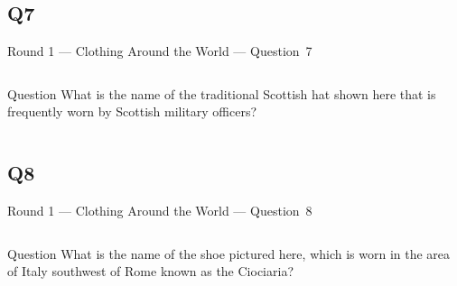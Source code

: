 \documentclass[11pt]{beamer}
\begin{document}
\subsection*{Q7}
\begin{frame}[t]{Round 1 --- Clothing Around the World --- \mbox{Question 7}}
\vspace{-0.5em}
\begin{columns}[T,totalwidth=\linewidth]
\begin{column}{0.37\linewidth}
\begin{block}{Question}
What is the name of the traditional Scottish hat shown here that is frequently worn by Scottish military officers?
\end{block}
\end{column}
\begin{column}{0.62\linewidth}
\begin{center}
\texttt{[image: \{Images/tamoshanter]}.jpeg}
\end{center}
\end{column}
\end{columns}
\end{frame}
\subsection*{Q8}
\begin{frame}[t]{Round 1 --- Clothing Around the World --- \mbox{Question 8}}
\vspace{-0.5em}
\begin{columns}[T,totalwidth=\linewidth]
\begin{column}{0.37\linewidth}
\begin{block}{Question}
What is the name of the shoe pictured here, which is worn in the area of Italy southwest of Rome known as the Ciociaria?
\end{block}
\end{column}
\begin{column}{0.62\linewidth}
\begin{center}
\texttt{[image: \{Images/italianshoe]}.jpg}
\end{center}
\end{column}
\end{columns}
\end{frame}
\end{document}
